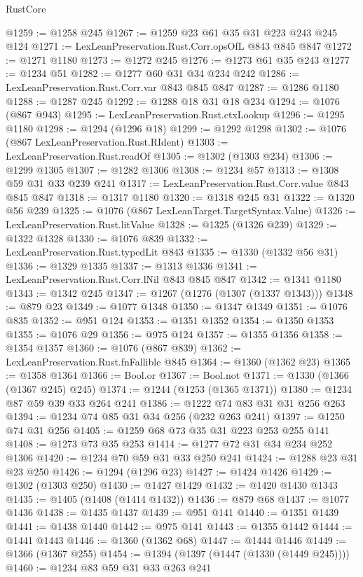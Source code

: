 \begin{lexlean}{RustCore}
\begin{coremodule}
@1259 := @1258 @245
@1267 := @1259 @23 @61 @35 @31 @223 @243 @245 @124
@1271 := LexLeanPreservation.Rust.Corr.opsOfL @843 @845 @847
@1272 := @1271 @1180
@1273 := @1272 @245
@1276 := @1273 @61 @35 @243
@1277 := @1234 @51
@1282 := @1277 @60 @31 @34 @234 @242
@1286 := LexLeanPreservation.Rust.Corr.var @843 @845 @847
@1287 := @1286 @1180
@1288 := @1287 @245
@1292 := @1288 @18 @31 @18 @234
@1294 := @1076 (@867 @943)
@1295 := LexLeanPreservation.Rust.ctxLookup
@1296 := @1295 @1180
@1298 := @1294 (@1296 @18)
@1299 := @1292 @1298
@1302 := @1076 (@867 LexLeanPreservation.Rust.RIdent)
@1303 := LexLeanPreservation.Rust.readOf
@1305 := @1302 (@1303 @234)
@1306 := @1299 @1305
@1307 := @1282 @1306
@1308 := @1234 @57
@1313 := @1308 @59 @31 @33 @239 @241
@1317 := LexLeanPreservation.Rust.Corr.value @843 @845 @847
@1318 := @1317 @1180
@1320 := @1318 @245 @31
@1322 := @1320 @56 @239
@1325 := @1076 (@867 LexLeanTarget.TargetSyntax.Value)
@1326 := LexLeanPreservation.Rust.litValue
@1328 := @1325 (@1326 @239)
@1329 := @1322 @1328
@1330 := @1076 @839
@1332 := LexLeanPreservation.Rust.typedLit @843
@1335 := @1330 (@1332 @56 @31)
@1336 := @1329 @1335
@1337 := @1313 @1336
@1341 := LexLeanPreservation.Rust.Corr.lNil @843 @845 @847
@1342 := @1341 @1180
@1343 := @1342 @245
@1347 := @1267 (@1276 (@1307 (@1337 @1343)))
@1348 := @879 @23
@1349 := @1077 @1348
@1350 := @1347 @1349
@1351 := @1076 @835
@1352 := @951 @124
@1353 := @1351 @1352
@1354 := @1350 @1353
@1355 := @1076 @29
@1356 := @975 @124
@1357 := @1355 @1356
@1358 := @1354 @1357
@1360 := @1076 (@867 @839)
@1362 := LexLeanPreservation.Rust.fnFallible @845
@1364 := @1360 (@1362 @23)
@1365 := @1358 @1364
@1366 := Bool.or
@1367 := Bool.not
@1371 := @1330 (@1366 (@1367 @245) @245)
@1374 := @1244 (@1253 (@1365 @1371))
@1380 := @1234 @87 @59 @39 @33 @264 @241
@1386 := @1222 @74 @83 @31 @31 @256 @263
@1394 := @1234 @74 @85 @31 @34 @256 (@232 @263 @241)
@1397 := @1250 @74 @31 @256
@1405 := @1259 @68 @73 @35 @31 @223 @253 @255 @141
@1408 := @1273 @73 @35 @253
@1414 := @1277 @72 @31 @34 @234 @252 @1306
@1420 := @1234 @70 @59 @31 @33 @250 @241
@1424 := @1288 @23 @31 @23 @250
@1426 := @1294 (@1296 @23)
@1427 := @1424 @1426
@1429 := @1302 (@1303 @250)
@1430 := @1427 @1429
@1432 := @1420 @1430 @1343
@1435 := @1405 (@1408 (@1414 @1432))
@1436 := @879 @68
@1437 := @1077 @1436
@1438 := @1435 @1437
@1439 := @951 @141
@1440 := @1351 @1439
@1441 := @1438 @1440
@1442 := @975 @141
@1443 := @1355 @1442
@1444 := @1441 @1443
@1446 := @1360 (@1362 @68)
@1447 := @1444 @1446
@1449 := @1366 (@1367 @255)
@1454 := @1394 (@1397 (@1447 (@1330 (@1449 @245))))
@1460 := @1234 @83 @59 @31 @33 @263 @241

\end{coremodule}
\end{lexlean}

